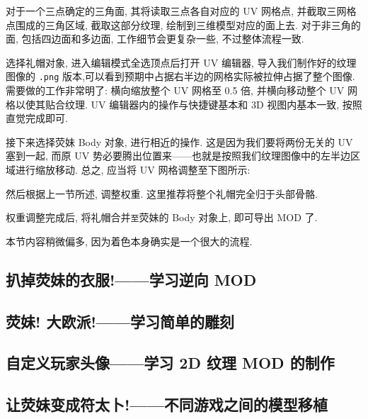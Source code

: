             \par 对于一个三点确定的三角面, 其将读取三点各自对应的 UV 网格点, 并截取三网格点围成的三角区域, 截取这部分纹理, 绘制到三维模型对应的面上去. 对于非三角的面, 包括四边面和多边面, 工作细节会更复杂一些, 不过整体流程一致.
            \par 选择礼帽对象, 进入编辑模式全选顶点后打开 UV 编辑器, 导入我们制作好的纹理图像的 \texttt{.png} 版本,可以看到预期中占据右半边的网格实际被拉伸占据了整个图像. 需要做的工作非常明了: 横向缩放整个 UV 网格至 0.5 倍, 并横向移动整个 UV 网格以使其贴合纹理. UV 编辑器内的操作与快捷键基本和 3D 视图内基本一致, 按照直觉完成即可.
            \par 接下来选择荧妹 Body 对象, 进行相近的操作. 这是因为我们要将两份无关的 UV 塞到一起, 而原 UV 势必要腾出位置来——也就是按照我们纹理图像中的左半边区域进行缩放移动. 总之, 应当将 UV 网格调整至下图所示:
            \begin{figure}[H]
                \centering
            \end{figure}
            然后根据上一节所述, 调整权重. 这里推荐将整个礼帽完全归于头部骨骼.
            \par 权重调整完成后, 将礼帽合并\texttt{至}荧妹的 Body 对象上, 即可导出 MOD 了.

            \par 本节内容稍微偏多, 因为着色本身确实是一个很大的流程.
        \subsection{扒掉荧妹的衣服!——学习逆向 MOD}
        \subsection{荧妹! 大欧派!——学习简单的雕刻}
        \subsection{自定义玩家头像——学习 2D 纹理 MOD 的制作}
        \subsection{让荧妹变成符太卜!——不同游戏之间的模型移植}
